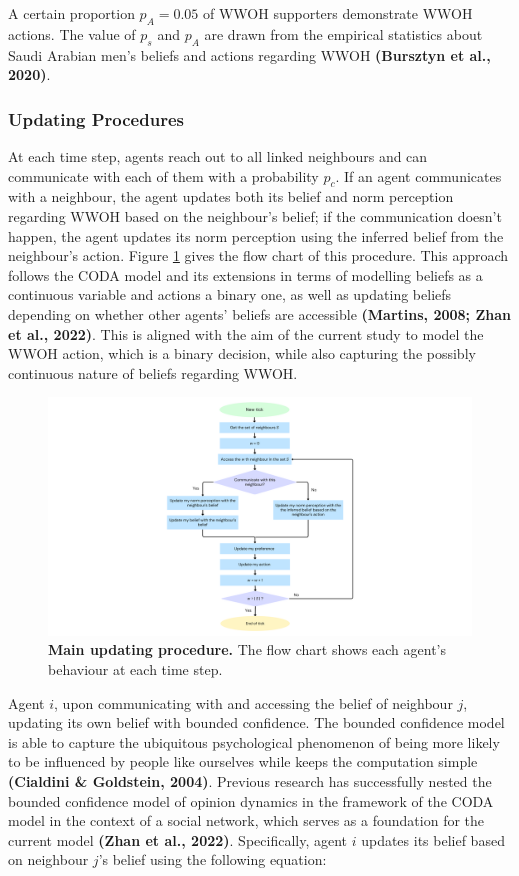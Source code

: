 \documentclass[
  11pt,
]{article}
\begin{document}
A certain proportion \(p_A = 0.05\) of WWOH supporters demonstrate WWOH
actions. The value of \(p_s\) and \(p_A\) are drawn from the empirical
statistics about Saudi Arabian men's beliefs and actions regarding WWOH
\textbf{(Bursztyn et al., 2020)}.

\hypertarget{updating-procedures}{%
\subsubsection{Updating Procedures}\label{updating-procedures}}

At each time step, agents reach out to all linked neighbours and can
communicate with each of them with a probability \(p_c\). If an agent
communicates with a neighbour, the agent updates both its belief and
norm perception regarding WWOH based on the neighbour's belief; if the
communication doesn't happen, the agent updates its norm perception
using the inferred belief from the neighbour's action. Figure
\ref{fig:1} gives the flow chart of this procedure. This approach
follows the CODA model and its extensions in terms of modelling beliefs
as a continuous variable and actions a binary one, as well as updating
beliefs depending on whether other agents' beliefs are accessible
\textbf{(Martins, 2008; Zhan et al., 2022)}. This is aligned with the
aim of the current study to model the WWOH action, which is a binary
decision, while also capturing the possibly continuous nature of beliefs
regarding WWOH.

\begin{figure}[h]
  \centering
  \includegraphics[width=0.8\columnwidth]{./figures/diss_flow_chart.pdf}
  \caption{\textbf{Main updating procedure.} The flow chart shows each agent's behaviour at each time step.}
  \label{fig:1}
\end{figure}

Agent \(i\), upon communicating with and accessing the belief of
neighbour \(j\), updating its own belief with bounded confidence. The
bounded confidence model is able to capture the ubiquitous psychological
phenomenon of being more likely to be influenced by people like
ourselves while keeps the computation simple \textbf{(Cialdini \&
Goldstein, 2004)}. Previous research has successfully nested the bounded
confidence model of opinion dynamics in the framework of the CODA model
in the context of a social network, which serves as a foundation for the
current model \textbf{(Zhan et al., 2022)}. Specifically, agent \(i\)
updates its belief based on neighbour \(j\)'s belief using the following
equation:
\end{document}
